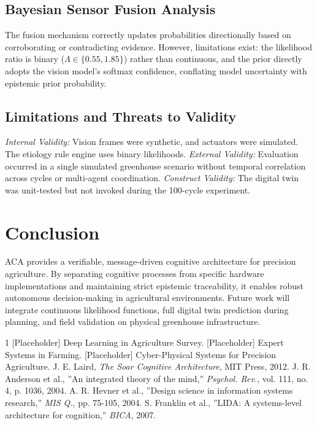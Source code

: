 \documentclass[journal, twocolumn]{IEEEtran}
\begin{document}
\subsection{Bayesian Sensor Fusion Analysis}
The fusion mechanism correctly updates probabilities directionally based on corroborating or contradicting evidence. However, limitations exist: the likelihood ratio is binary ($\Lambda \in \{0.55, 1.85\}$) rather than continuous, and the prior directly adopts the vision model's softmax confidence, conflating model uncertainty with epistemic prior probability.

\subsection{Limitations and Threats to Validity}
\textit{Internal Validity:} Vision frames were synthetic, and actuators were simulated. The etiology rule engine uses binary likelihoods.
\textit{External Validity:} Evaluation occurred in a single simulated greenhouse scenario without temporal correlation across cycles or multi-agent coordination.
\textit{Construct Validity:} The digital twin was unit-tested but not invoked during the 100-cycle experiment.

\section{Conclusion}
ACA provides a verifiable, message-driven cognitive architecture for precision agriculture. By separating cognitive processes from specific hardware implementations and maintaining strict epistemic traceability, it enables robust autonomous decision-making in agricultural environments. Future work will integrate continuous likelihood functions, full digital twin prediction during planning, and field validation on physical greenhouse infrastructure.

\begin{thebibliography}{1}
 [Placeholder] Deep Learning in Agriculture Survey.
 [Placeholder] Expert Systems in Farming.
 [Placeholder] Cyber-Physical Systems for Precision Agriculture.
 J. E. Laird, \textit{The Soar Cognitive Architecture}, MIT Press, 2012.
 J. R. Anderson et al., ''An integrated theory of the mind,'' \textit{Psychol. Rev.}, vol. 111, no. 4, p. 1036, 2004.
 A. R. Hevner et al., ''Design science in information systems research,'' \textit{MIS Q.}, pp. 75-105, 2004.
 S. Franklin et al., ''LIDA: A systems-level architecture for cognition,'' \textit{BICA}, 2007.
\end{thebibliography}
\end{document}

